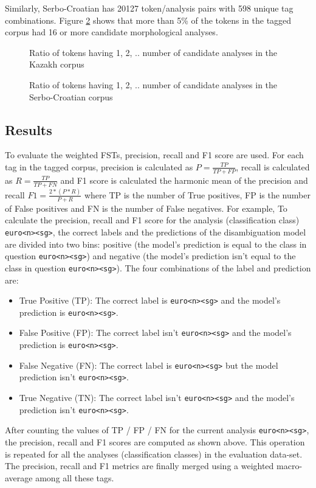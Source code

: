 \documentclass[free]{flammie}
\begin{document}
Similarly, Serbo-Croatian has 20127 token/analysis pairs with 598 unique tag
combinations. Figure \ref{fig:serbo-croatian-corpus} shows that more than 5\% of
the tokens in the tagged corpus had 16 or more candidate morphological analyses.

\begin{figure}
\caption{\label{fig:kazakh-corpus} Ratio of tokens having 1, 2, .. number of
    candidate analyses in the Kazakh corpus}
\end{figure}

\begin{figure}
\caption{\label{fig:serbo-croatian-corpus} Ratio of tokens having 1, 2, ..
    number of candidate analyses in the Serbo-Croatian corpus}
\end{figure}


\subsection{Results}


To evaluate the weighted FSTs, precision, recall and F1 score are used. For each
tag in the tagged corpus, precision is calculated as \(P = \frac{TP}{TP+FP}\),
recall is calculated as \(R = \frac{TP}{TP+FN}\) and F1 score is calculated the
harmonic mean of the precision and recall \(F1 = \frac{2 * (P * R)}{P + R}\)
where TP is the number of True positives, FP is the number of False positives
and FN is the number of False negatives.  For example, To calculate the
precision, recall and F1 score for the analysis (classification class)
\texttt{euro<n><sg>}, the correct labels and the predictions of the
disambiguation model are divided into two bins: positive (the model's prediction
is equal to the class in question \texttt{euro<n><sg>}) and negative (the
model's prediction isn't equal to the class in question \texttt{euro<n><sg>}).
The four combinations of the label and prediction are:
\begin{itemize}
\item True Positive (TP): The correct label is \texttt{euro<n><sg>} and the
    model's prediction is \texttt{euro<n><sg>}.
\item False Positive (FP): The correct label isn't \texttt{euro<n><sg>} and the
    model's prediction is \texttt{euro<n><sg>}.
\item False Negative (FN): The correct label is \texttt{euro<n><sg>} but the
    model prediction isn't \texttt{euro<n><sg>}.
\item True Negative (TN): The correct label isn't \texttt{euro<n><sg>} and the
    model's prediction isn't \texttt{euro<n><sg>}.
\end{itemize}
After counting the values of TP / FP / FN for the current analysis
\texttt{euro<n><sg>}, the precision, recall and F1 scores are computed as shown
above.  This operation is repeated for all the analyses (classification classes)
in the evaluation data-set.  The precision, recall and F1 metrics are finally
merged using a weighted macro-average among all these tags.
\end{document}
